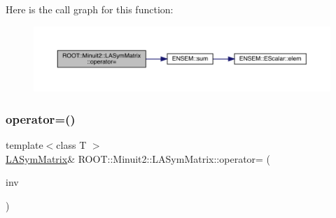Here is the call graph for this function\+:
\nopagebreak
\begin{figure}[H]
\begin{center}
\leavevmode
\includegraphics[width=350pt]{d3/d72/classROOT_1_1Minuit2_1_1LASymMatrix_abaf8a2feeb04c66aca17e5876dd7aaff_cgraph}
\end{center}
\end{figure}
\mbox{\label{classROOT_1_1Minuit2_1_1LASymMatrix_a95fd77b55f726095a231817852fceb7d}} 
\subsubsection{\texorpdfstring{operator=()}{operator=()}\hspace{0.1cm}{\footnotesize\ttfamily [16/21]}}
{\footnotesize\ttfamily template$<$class T $>$ \\
\mbox{\hyperlink{classROOT_1_1Minuit2_1_1LASymMatrix}{L\+A\+Sym\+Matrix}}\& R\+O\+O\+T\+::\+Minuit2\+::\+L\+A\+Sym\+Matrix\+::operator= (\begin{DoxyParamCaption}\item[{const \mbox{\hyperlink{classROOT_1_1Minuit2_1_1ABObj}{A\+B\+Obj}}$<$ \mbox{\hyperlink{classROOT_1_1Minuit2_1_1sym}{sym}}, \mbox{\hyperlink{classROOT_1_1Minuit2_1_1MatrixInverse}{Matrix\+Inverse}}$<$ \mbox{\hyperlink{classROOT_1_1Minuit2_1_1sym}{sym}}, \mbox{\hyperlink{classROOT_1_1Minuit2_1_1ABObj}{A\+B\+Obj}}$<$ \mbox{\hyperlink{classROOT_1_1Minuit2_1_1sym}{sym}}, \mbox{\hyperlink{classROOT_1_1Minuit2_1_1LASymMatrix}{L\+A\+Sym\+Matrix}}, T $>$, T $>$, T $>$ \&}]{inv }\end{DoxyParamCaption})\hspace{0.3cm}{\ttfamily [inline]}}


